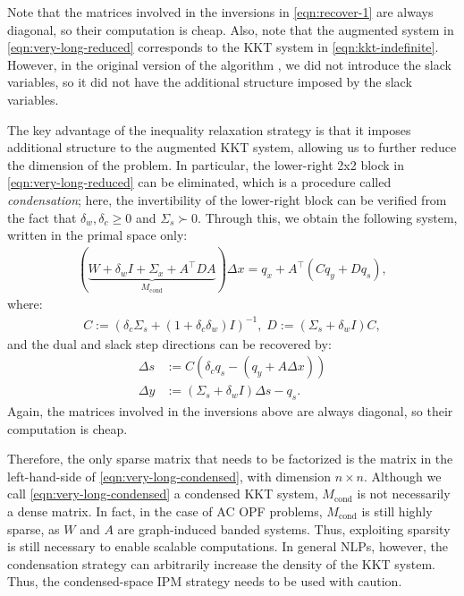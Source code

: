 Note that the matrices involved in the inversions in \eqref{eqn:recover-1}
are always diagonal, so their computation is cheap.
Also, note that the augmented system in \eqref{eqn:very-long-reduced}
corresponds to the KKT system in \eqref{eqn:kkt-indefinite}. However,
in the original version of the algorithm \cite{pacaud2023accelerating}, we did not introduce the
slack variables, so it did not have the additional structure imposed
by the slack variables.

The key advantage of the inequality relaxation strategy is that it
imposes additional structure to the augmented KKT system, allowing us to
further reduce the dimension of the problem. In particular, the
lower-right 2x2 block in \eqref{eqn:very-long-reduced} can be
eliminated, which is a procedure called {\it condensation}; here, the invertibility of the lower-right block can be verified from the fact that $\delta_w,\delta_c\geq 0$ and $\Sigma_s\succ 0$. Through this,
we obtain the following system, written in the  primal
space only:
\begin{align}\label{eqn:very-long-condensed}
  (\underbrace{W + \delta_wI + \Sigma_x + A^{\top} D A}_{M_\text{cond}} ) \Delta x = q_x + A^\top (C q_y +  Dq_s ),
\end{align}
where:
\begin{align*}
  C := \left(\delta_c \Sigma_s + (1+\delta^{}_c\delta^{}_w) I\right)^{-1}, \;
  D := \left(\Sigma_s + \delta^{}_w I\right)C,
\end{align*}
and the dual and slack step directions can be recovered by:
\begin{align}
  \Delta s &:= C \left(\delta_c q_s - (q_y + A\Delta x)\right)\nonumber\\
  \Delta y &:= (\Sigma_s + \delta_w I) \Delta s -q_s.\label{eqn:recover-2}
\end{align}
Again, the matrices involved in the inversions above are always
diagonal, so their computation is cheap.

Therefore, the only sparse matrix that needs to be factorized is the
matrix in the left-hand-side of \eqref{eqn:very-long-condensed}, with
dimension $n \times n$.  Although we call
\eqref{eqn:very-long-condensed} a condensed KKT system,
$M_\text{cond}$ is not necessarily a dense matrix. In fact, in the
case of AC OPF problems, $M_\text{cond}$ is still highly sparse, as
$W$ and $A$ are graph-induced banded systems.  Thus, exploiting
sparsity is still necessary to enable scalable computations.  In
general NLPs, however, the condensation strategy can arbitrarily
increase the density of the KKT system. Thus, the condensed-space IPM
strategy needs to be used with caution.

